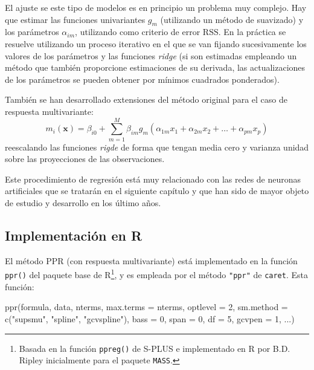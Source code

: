 \documentclass[
]{book}
\newenvironment{Shaded}{\begin{snugshade}}{\end{snugshade}}
\newcommand{\AttributeTok}[1]{\textcolor[rgb]{0.77,0.63,0.00}{#1}}
\newcommand{\DecValTok}[1]{\textcolor[rgb]{0.00,0.00,0.81}{#1}}
\newcommand{\FunctionTok}[1]{\textcolor[rgb]{0.00,0.00,0.00}{#1}}
\newcommand{\NormalTok}[1]{#1}
\newcommand{\StringTok}[1]{\textcolor[rgb]{0.31,0.60,0.02}{#1}}
\theoremstyle{break}
\theoremstyle{definition}
\theoremstyle{definition}
\theoremstyle{definition}
\theoremstyle{definition}
\theoremstyle{remark}
\begin{document}
El ajuste se este tipo de modelos es en principio un problema muy complejo.
Hay que estimar las funciones univariantes \(g_m\) (utilizando un método de suavizado) y los parámetros \(\alpha_{im}\), utilizando como criterio de error \(\mbox{RSS}\).
En la práctica se resuelve utilizando un proceso iterativo en el que se van fijando sucesivamente los valores de los parámetros y las funciones \emph{ridge} (si son estimadas empleando un método que también proporcione estimaciones de su derivada, las actualizaciones de los parámetros se pueden obtener por mínimos cuadrados ponderados).

También se han desarrollado extensiones del método original para el caso de respuesta multivariante:
\[m_i(\mathbf{x}) = \beta_{i0} + \sum_{m=1}^M \beta_{im} g_m (\alpha_{1m}x_1 + \alpha_{2m}x_2 + \ldots + \alpha_{pm}x_p)\]
reescalando las funciones \emph{rigde} de forma que tengan media cero y varianza unidad sobre las proyecciones de las observaciones.

Este procedimiento de regresión está muy relacionado con las redes de neuronas artificiales que se tratarán en el siguiente capítulo y que han sido de mayor objeto de estudio y desarrollo en los último años.

\hypertarget{implementaciuxf3n-en-r-1}{%
\subsection{Implementación en R}\label{implementaciuxf3n-en-r-1}}

El método PPR (con respuesta multivariante) está implementado en la función \texttt{ppr()} del paquete base de R\footnote{Basada en la función \texttt{ppreg()} de S-PLUS e implementado en R por B.D. Ripley inicialmente para el paquete \texttt{MASS}.}, y es empleada por el método \texttt{"ppr"} de \texttt{caret}.
Esta función:

\begin{Shaded}
\begin{Highlighting}[]
\FunctionTok{ppr}\NormalTok{(formula, data, nterms, }\AttributeTok{max.terms =}\NormalTok{ nterms, }\AttributeTok{optlevel =} \DecValTok{2}\NormalTok{,}
    \AttributeTok{sm.method =} \FunctionTok{c}\NormalTok{(}\StringTok{"supsmu"}\NormalTok{, }\StringTok{"spline"}\NormalTok{, }\StringTok{"gcvspline"}\NormalTok{),}
    \AttributeTok{bass =} \DecValTok{0}\NormalTok{, }\AttributeTok{span =} \DecValTok{0}\NormalTok{, }\AttributeTok{df =} \DecValTok{5}\NormalTok{, }\AttributeTok{gcvpen =} \DecValTok{1}\NormalTok{, ...)}
\end{Highlighting}
\end{Shaded}
\end{document}
